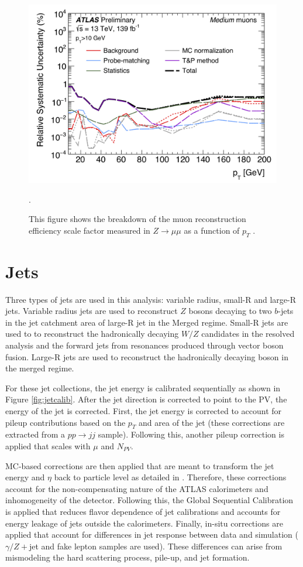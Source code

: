 \begin{figure}[h!]
  \centering
  \includegraphics[width=\hsize]{figures/Analysis/muon_syst.png}
  \caption{{This figure shows the breakdown of the muon reconstruction efficiency scale factor measured in $Z \rightarrow \mu \mu$ as a function of $p_{T}$ \cite{muon_calib}. }}. 
  \label{fig:muon_syst}
\end{figure} 
\FloatBarrier

\section{Jets}
Three types of jets are used in this analysis: variable radius, small-R and large-R jets. Variable radius jets are used to reconstruct $Z$ bosons decaying to two $b$-jets in the jet catchment area of large-R jet in the Merged regime. Small-R jets are used to to reconstruct the hadronically decaying $W/Z$ candidates in the resolved analysis and the forward jets from resonances produced through vector boson fusion. Large-R jets are used to reconstruct the hadronically decaying boson in the merged regime.

For these jet collections, the jet energy is calibrated sequentially as shown in Figure \ref{fig:jetcalib}. After the jet direction is corrected to point to the PV, the energy of the jet is corrected. First, the jet energy is corrected to account for pileup contributions based on the $p_{T}$ and area of the jet (these corrections are extracted from a $pp \rightarrow jj$ sample). Following this, another pileup correction is applied that scales with $\mu$ and $N_{PV}$. 

MC-based corrections are then applied that are meant to transform the jet energy and $\eta$ back to particle level as detailed in \cite{jet_energy_calib}. Therefore, these corrections account for the non-compensating nature of the ATLAS calorimeters and inhomogeneity of the detector. Following this, the Global Sequential Calibration is applied that reduces flavor dependence of jet calibrations and accounts for energy leakage of jets outside the calorimeters. Finally, in-situ corrections are applied that account for differences in jet response between data and simulation ($\gamma /Z+$jet and fake lepton samples are used). These differences can arise from mismodeling the hard scattering process, pile-up, and jet formation. 

